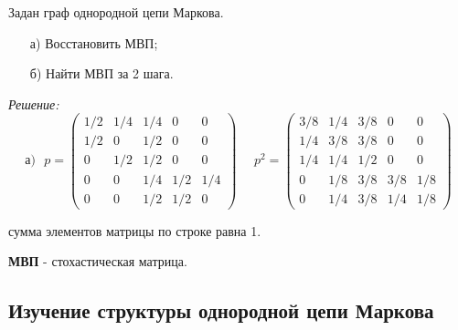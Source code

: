 \begin{exmp}\label{cm-ex_2}
	Задан граф однородной цепи Маркова.
	\begin{figure}[h]
	\end{figure}
	\begin{enumerate}
		\item[а)] Восстановить МВП;
		\item[б)] Найти МВП за 2 шага.
	\end{enumerate}
	\textit{Решение:}
	\[
	\text{а)} ~~~
	p =
	\begin{pmatrix}
		1/2 & 1/4 & 1/4 & 0 & 0 \\
		1/2 & 0 & 1/2 & 0 & 0 \\
		0 & 1/2 & 1/2 & 0 & 0 \\
		0 & 0 & 1/4 & 1/2 & 1/4 \\
		0 & 0 & 1/2 & 1/2 & 0
	\end{pmatrix}
	~~~~~~
	p^2 =
	\begin{pmatrix}
		3/8 & 1/4 & 3/8 & 0 & 0 \\
		1/4 & 3/8 & 3/8 & 0 & 0 \\
		1/4 & 1/4 & 1/2 & 0 & 0 \\
		0 & 1/8 & 3/8 & 3/8 & 1/8 \\
		0 & 1/4 & 3/8 & 1/4 & 1/8
	\end{pmatrix}
	\]
\end{exmp}
\begin{remark}
	сумма элементов матрицы по строке равна 1.
\end{remark}
\noindent\textbf{МВП} - стохастическая матрица.

\subsection{Изучение структуры однородной цепи Маркова}

